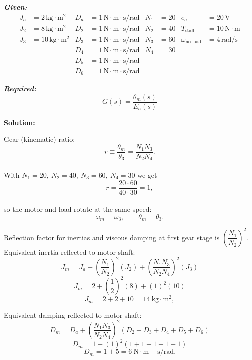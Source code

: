 ﻿\documentclass[11pt]{article}
\begin{document}
\vspace{12pt}

\noindent\textbf{\textit{Given:}}
\[
\begin{aligned}
J_a &= 2\, \text{kg}\cdot\text{m}^2 & D_a &= 1\, \text{N}\cdot\text{m}\cdot\text{s/rad} & N_1 &= 20 & e_a &= 20\,\text{V} \\
J_2 &= 8\, \text{kg}\cdot\text{m}^2 & D_2 &= 1\, \text{N}\cdot\text{m}\cdot\text{s/rad} & N_2 &= 40 & T_{\text{stall}} &= 10\,\text{N}\cdot\text{m} \\
J_3 &= 10\, \text{kg}\cdot\text{m}^2 & D_3 &= 1\, \text{N}\cdot\text{m}\cdot\text{s/rad} & N_3 &= 60 & \omega_{\text{no-load}} &= 4\,\text{rad/s} \\
& & D_4 &= 1\, \text{N}\cdot\text{m}\cdot\text{s/rad} & N_4 &= 30 & & \\
& & D_5 &= 1\, \text{N}\cdot\text{m}\cdot\text{s/rad} & & & & \\
& & D_6 &= 1\, \text{N}\cdot\text{m}\cdot\text{s/rad} & & & &
\end{aligned}
\]

\vspace{12pt}

\noindent \textbf{\textit{Required:}}
\[
G(s) = \frac{\theta_m(s)}{E_a(s)}
\]

\vspace{12pt}

\noindent \textbf{Solution:}

Gear (kinematic) ratio:
\[
r \equiv \frac{\theta_m}{\theta_3}=\frac{N_1 N_3}{N_2 N_4}.
\]  \\

With \(N_1=20,\ N_2=40,\ N_3=60,\ N_4=30\) we get
\[
r=\frac{20 \cdot 60}{40 \cdot 30}=1,
\] \\

so the motor and load rotate at the same speed:
\[
\omega_m = \omega_3,\qquad \theta_m = \theta_3.
\]

Reflection factor for inertias and viscous damping at first gear stage is \(\left(\dfrac{N_1}{N_2}\right)^2\). \\

Equivalent inertia reflected to motor shaft:
\[
J_m = J_a + \left(\frac{N_1}{N_2}\right)^2 (J_2) + \left(\frac{N_1 N_3}{N_2 N_4}\right)^2 (J_3)
\]
\[
J_m = 2 + \left(\frac{1}{2}\right)^2 (8) + (1)^2 (10)
\]
\[
J_m = 2 + 2 + 10 = 14\ \mathrm{kg\cdot m^2},
\]

Equivalent damping reflected to motor shaft:
\[
D_m = D_a + \left(\frac{N_1 N_3}{N_2 N_4}\right)^2 (D_2 + D_3 + D_4 + D_5 + D_6)
\]
\[
D_m = 1 + (1)^2 (1 + 1 + 1 + 1 + 1)
\]
\[
D_m = 1 + 5 = 6\ \mathrm{N\cdot m\!-\!s/rad}.
\]
\end{document}
